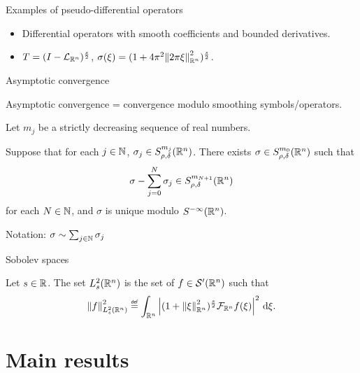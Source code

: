\documentclass{beamer}
\begin{document}
\begin{frame}
    {Examples of pseudo-differential operators}

    \begin{itemize}
        \item Differential operators with smooth coefficients and bounded derivatives.
        \item $T = \BesselPotential s$, $\sigma(\xi) = (1 + 4 \pi^2 \norm [\R^n] {\turn \xi}^2)^{\frac s 2}$.
    \end{itemize}
\end{frame}

\begin{frame}
    {Asymptotic convergence}

    Asymptotic convergence = convergence modulo smoothing symbols/operators.
    \pause
    \begin{theorem}
        Let $m_j$ be a strictly decreasing sequence of real numbers.

        Suppose that for each $j \in \N$, $\sigma_j \in \SymbolClass {m_j} {\rho, \delta}$.
        There exists $\sigma \in \SymbolClass {m_0} {\rho, \delta}$ such that \begin{align*}
            \sigma - \sum_{j = 0}^{N} \sigma_j \in \SymbolClass {m_{N + 1}} {\rho, \delta}
        \end{align*}
        for each $N \in \N$,
        and $\sigma$ is unique modulo $\SmoothingSymbols$.
    \end{theorem}

    \pause
    Notation: $\sigma \sim \sum_{j \in \N} \sigma_j$
\end{frame}

\begin{frame}
    {Sobolev spaces}

    \begin{definition}
        Let $s \in \R$.
        The set $\Sobolev s$ is the set of $f \in \TemperedDistributions \Group$ such that
        \begin{align*}
            \norm [\Sobolev s] f^2
            \defeq \int_{\R^n} \abs{(1 + \norm [\R^n] \xi^2)^\frac s 2 \Fourier f(\xi)}^2 \dd \xi.
        \end{align*}
    \end{definition}
\end{frame}

\section{Main results}
\end{document}
